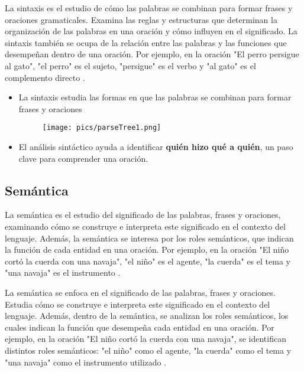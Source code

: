 La sintaxis es el estudio de cómo las palabras se combinan para formar frases y oraciones gramaticales. Examina las reglas y estructuras que determinan la organización de las palabras en una oración y cómo influyen en el significado. La sintaxis también se ocupa de la relación entre las palabras y las funciones que desempeñan dentro de una oración. Por ejemplo, en la oración "El perro persigue al gato", "el perro" es el sujeto, "persigue" es el verbo y "al gato" es el complemento directo \cite{JohnsonMLSS}.

\begin{itemize}
\item La sintaxis estudia las formas en que las palabras se combinan para formar frases y oraciones \cite{JohnsonMLSS}
\begin{figure}[h]
\texttt{[image: pics/parseTree1.png]}
\end{figure}
\item El análisis sintáctico ayuda a identificar \textbf{quién hizo qué a quién}, un paso clave para comprender una oración.
\end{itemize}


\subsection{Semántica}

La semántica es el estudio del significado de las palabras, frases y oraciones, examinando cómo se construye e interpreta este significado en el contexto del lenguaje. Además, la semántica se interesa por los roles semánticos, que indican la función de cada entidad en una oración. Por ejemplo, en la oración "El niño cortó la cuerda con una navaja", "el niño" es el agente, "la cuerda" es el tema y "una navaja" es el instrumento \cite{JohnsonMLSS}.

La semántica se enfoca en el significado de las palabras, frases y oraciones. Estudia cómo se construye e interpreta este significado en el contexto del lenguaje. Además, dentro de la semántica, se analizan los roles semánticos, los cuales indican la función que desempeña cada entidad en una oración. Por ejemplo, en la oración "El niño cortó la cuerda con una navaja", se identifican distintos roles semánticos: "el niño" como el agente, "la cuerda" como el tema y "una navaja" como el instrumento utilizado \cite{JohnsonMLSS}.



